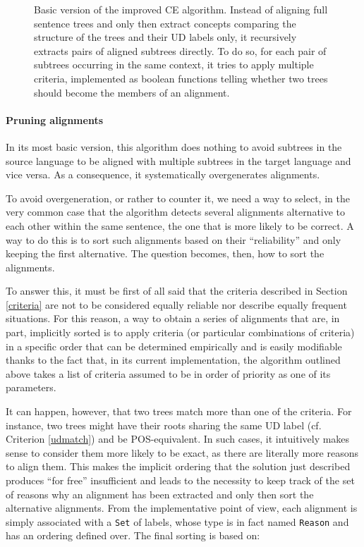 \begin{figure}[h]
 \centering
 
 \caption[Basic version of the improved CE algorithm]{Basic version of the improved CE algorithm. Instead of aligning full sentence trees and only then extract concepts comparing the structure of the trees and their UD labels only, it recursively extracts pairs of aligned subtrees directly. To do so, for each pair of subtrees occurring in the same context, it tries to apply multiple criteria, implemented as boolean functions telling whether two trees should become the members of an alignment.}
 \label{extr}
\end{figure}

\paragraph{Pruning alignments} \label{pruning} 
In its most basic version, this algorithm does nothing to avoid subtrees in the source language to be aligned with multiple subtrees in the target language and vice versa. As a consequence, it systematically overgenerates alignments. \smallskip

To avoid overgeneration, or rather to counter it, we need a way to select, in the very common case that the algorithm detects several alignments alternative to each other within the same sentence, the one that is more likely to be correct. A way to do this is to sort such alignments based on their ``reliability'' and only keeping the first alternative. The question becomes, then, how to sort the alignments. \smallskip

To answer this, it must be first of all said that the criteria described in Section \ref{criteria} are not to be considered equally reliable nor describe equally frequent situations. For this reason, a way to obtain a series of alignments that are, in part, implicitly sorted is to apply criteria (or particular combinations of criteria) in a specific order that can be determined empirically and is easily modifiable thanks to the fact that, in its current implementation, the algorithm outlined above takes a list of criteria assumed to be in order of priority as one of its parameters. \smallskip

It can happen, however, that two trees match more than one of the criteria. For instance, two trees might have their roots sharing the same UD label (cf. Criterion \ref{udmatch}) and be POS-equivalent. In such cases, it intuitively makes sense to consider them more likely to be exact, as there are literally more reasons to align them. This makes the implicit ordering that the solution just described produces ``for free'' insufficient and leads to the necessity to keep track of the set of reasons why an alignment has been extracted and only then sort the alternative alignments. From the implementative point of view, each alignment is simply associated with a \texttt{Set} of labels, whose type is in fact named \texttt{Reason} and has an ordering defined over. The final sorting is based on:\smallskip


